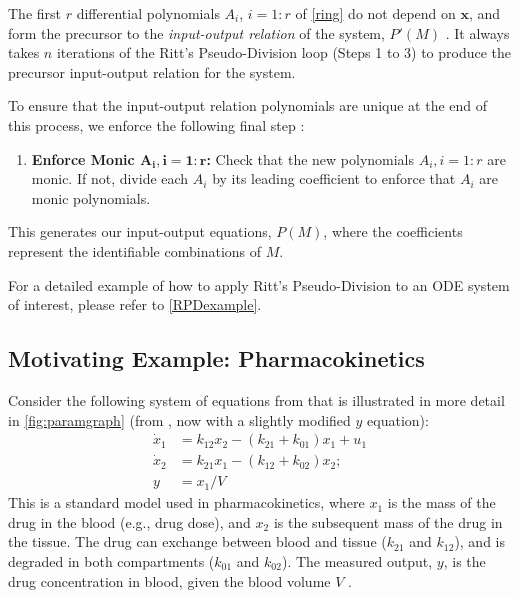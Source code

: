 \documentclass[a4paper,fleqn]{cas-dc}
\theoremstyle{definition}
\begin{document}
The first $r$ differential polynomials $A_i$, $i = 1:r$ of \cref{ring} do not depend on $\pmb{x}$, and  form the precursor to the \textit{input-output relation} of the system, $P'(M)$ \cite{bellu2007daisy}.
It always takes $n$ iterations of the Ritt's Pseudo-Division loop (Steps 1 to 3) to produce the precursor input-output relation for the system.


To ensure that the input-output relation polynomials are unique at the end of this process, we enforce the following final step \cite{bellu2007daisy}:
\begin{enumerate}[start=4]
    \item \textbf{Enforce Monic $\pmb{A_i, i = 1:r}$:} Check that the new polynomials $A_i, i = 1:r$ are monic. If not, divide each $A_i$ by its leading coefficient to enforce that $A_i$ are monic polynomials.
\end{enumerate}
This generates our input-output equations, $P(M)$, where the coefficients represent the identifiable combinations of $M$.


\vspace{0.2cm}
For a detailed example of how to apply Ritt's Pseudo-Division to an ODE system of interest, please refer to \cref{RPDexample}.


\subsection{Motivating Example: Pharmacokinetics} \label{ss:MotEx2_diff_alg}

\noindent Consider the following system of equations from \citet{eisenbergDeterminingIdentifiableParameter2014} that is illustrated in more detail in \cref{fig:paramgraph} (from , now with a slightly modified $y$ equation):
 \begin{align} 
     \dot{x}_1 & = k_{12} x_2 - (k_{21} + k_{01}) x_1 + u_1  \label{ex2_diff_alg} \\  \nonumber
     \dot{x}_2 & = k_{21} x_1 - (k_{12} + k_{02}) x_2; \\ \nonumber
     y & = x_1 / V 
 \end{align}
This is a standard model used in pharmacokinetics, where $x_1$ is the mass of the drug in the blood (e.g., drug dose), and $x_2$ is the subsequent mass of the drug in the tissue.
The drug can exchange between blood and tissue ($k_{21}$ and $k_{12}$), and is degraded in both compartments ($k_{01}$ and $k_{02}$).
The measured output, $y$, is the drug concentration in blood, given the blood volume $V$ \cite{distefano2015dynamic,eisenbergDeterminingIdentifiableParameter2014, audoly2001global, meshkat2009algorithm}.
\end{document}
